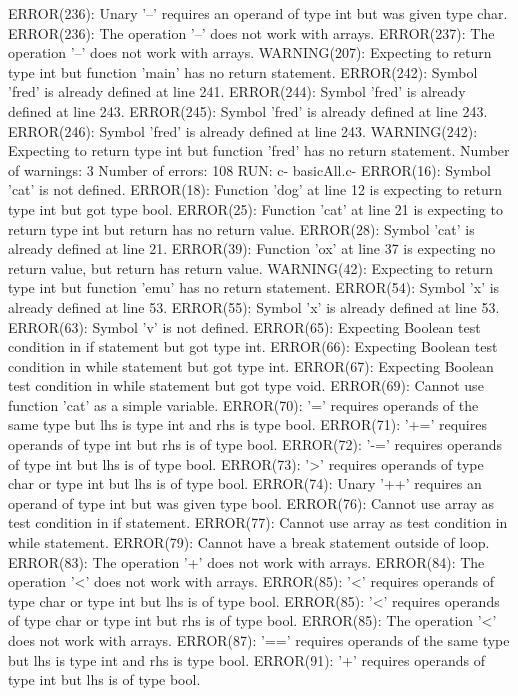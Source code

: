 \documentclass[12pt]{book}
\begin{document}
ERROR(236): Unary '--' requires an operand of type int but was given type char.
ERROR(236): The operation '--' does not work with arrays.
ERROR(237): The operation '--' does not work with arrays.
WARNING(207): Expecting to return type int but function 'main' has no return statement.
ERROR(242): Symbol 'fred' is already defined at line 241.
ERROR(244): Symbol 'fred' is already defined at line 243.
ERROR(245): Symbol 'fred' is already defined at line 243.
ERROR(246): Symbol 'fred' is already defined at line 243.
WARNING(242): Expecting to return type int but function 'fred' has no return statement.
Number of warnings: 3
Number of errors: 108
RUN: c- basicAll.c-
ERROR(16): Symbol 'cat' is not defined.
ERROR(18): Function 'dog' at line 12 is expecting to return type int but got type bool.
ERROR(25): Function 'cat' at line 21 is expecting to return type int but return has no return value.
ERROR(28): Symbol 'cat' is already defined at line 21.
ERROR(39): Function 'ox' at line 37 is expecting no return value, but return has return value.
WARNING(42): Expecting to return type int but function 'emu' has no return statement.
ERROR(54): Symbol 'x' is already defined at line 53.
ERROR(55): Symbol 'x' is already defined at line 53.
ERROR(63): Symbol 'v' is not defined.
ERROR(65): Expecting Boolean test condition in if statement but got type int.
ERROR(66): Expecting Boolean test condition in while statement but got type int.
ERROR(67): Expecting Boolean test condition in while statement but got type void.
ERROR(69): Cannot use function 'cat' as a simple variable.
ERROR(70): '=' requires operands of the same type but lhs is type int and rhs is type bool.
ERROR(71): '+=' requires operands of type int but rhs is of type bool.
ERROR(72): '-=' requires operands of type int but lhs is of type bool.
ERROR(73): '>' requires operands of type char or type int but lhs is of type bool.
ERROR(74): Unary '++' requires an operand of type int but was given type bool.
ERROR(76): Cannot use array as test condition in if statement.
ERROR(77): Cannot use array as test condition in while statement.
ERROR(79): Cannot have a break statement outside of loop.
ERROR(83): The operation '+' does not work with arrays.
ERROR(84): The operation '<' does not work with arrays.
ERROR(85): '<' requires operands of type char or type int but lhs is of type bool.
ERROR(85): '<' requires operands of type char or type int but rhs is of type bool.
ERROR(85): The operation '<' does not work with arrays.
ERROR(87): '==' requires operands of the same type but lhs is type int and rhs is type bool.
ERROR(91): '+' requires operands of type int but lhs is of type bool.
\end{document}
